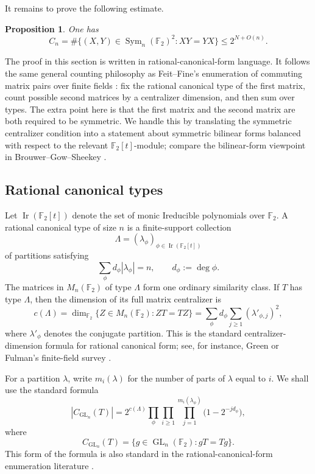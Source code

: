 \documentclass[11pt]{amsart}
\newtheorem{proposition}[theorem]{Proposition}
\theoremstyle{remark}
\numberwithin{equation}{section}
\newcommand{\F}{\mathbb F}
\newcommand{\Sym}{\operatorname{Sym}}
\newcommand{\GL}{\operatorname{GL}}
\DeclareMathOperator{\Ir}{Ir}
\begin{document}
It remains to prove the following estimate.

\begin{proposition}\label{prop:commuting-pairs}
One has
\[
        C_n=\#\{(X,Y)\in\Sym_n(\F_2)^2:XY=YX\}\leq 2^{N+O(n)}.
\]
\end{proposition}

The proof in this section is written in rational-canonical-form language.  It follows the same general counting philosophy as Feit--Fine's enumeration of commuting matrix pairs over finite fields \cite{FeitFine1960}: fix the rational canonical type of the first matrix, count possible second matrices by a centralizer dimension, and then sum over types.  The extra point here is that the first matrix and the second matrix are both required to be symmetric.  We handle this by translating the symmetric centralizer condition into a statement about symmetric bilinear forms balanced with respect to the relevant $\F_2[t]$-module; compare the bilinear-form viewpoint in Brouwer--Gow--Sheekey \cite{BrouwerGowSheekey2014}.

\subsection{Rational canonical types}

Let $\Ir(\F_2[t])$ denote the set of monic Ireducible polynomials over $\F_2$.  A rational canonical type of size $n$ is a finite-support collection
\[
        \Lambda=(\lambda_\phi)_{\phi\in\Ir(\F_2[t])}
\]
of partitions satisfying
\[
        \sum_\phi d_\phi |\lambda_\phi|=n,
        \qquad d_\phi:=\deg \phi.
\]
The matrices in $M_n(\F_2)$ of type $\Lambda$ form one ordinary similarity class.  If $T$ has type $\Lambda$, then the dimension of its full matrix centralizer is
\begin{equation}\label{eq:centralizer-dimension-lambda}
        c(\Lambda)=\dim_{\F_2}\{Z\in M_n(\F_2):ZT=TZ\}
        =\sum_\phi d_\phi\sum_{j\geq1}(\lambda'_{\phi,j})^2,
\end{equation}
where $\lambda'_{\phi}$ denotes the conjugate partition.  This is the standard centralizer-dimension formula for rational canonical form; see, for instance, Green \cite{Green1955} or Fulman's finite-field survey \cite{Fulman2002}.

For a partition $\lambda$, write $m_i(\lambda)$ for the number of parts of $\lambda$ equal to $i$.  We shall use the standard formula
\begin{equation}\label{eq:gl-centralizer-formula}
        |C_{\GL_n}(T)|
        =2^{c(\Lambda)}
        \prod_\phi\prod_{i\geq1}\prod_{j=1}^{m_i(\lambda_\phi)}
        \bigl(1-2^{-jd_\phi}\bigr),
\end{equation}
where
\[
        C_{\GL_n}(T)=\{g\in\GL_n(\F_2):gT=Tg\}.
\]
This form of the formula is also standard in the rational-canonical-form enumeration literature \cite{Fulman2002}.
\end{document}

